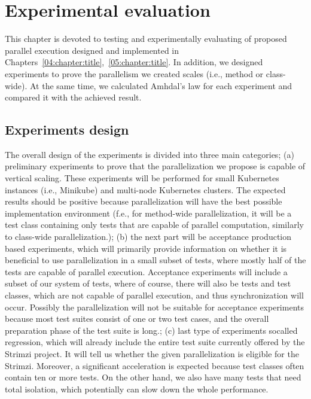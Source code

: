 \chapter{Experimental evaluation}
\label{06:chapter:title}

This chapter is devoted to testing and experimentally evaluating of proposed parallel execution designed and implemented in
Chapters~\ref{04:chapter:title},~\ref{05:chapter:title}.
In addition, we designed experiments to prove the parallelism we created scales (i.e., method or class-wide).
At the same time, we calculated Amhdal's law for each experiment and compared it with the achieved result.

\section{Experiments design}

The overall design of the experiments is divided into three main categories;
(a) preliminary experiments to prove that the parallelization we propose is capable of vertical scaling.
These experiments will be performed for small Kubernetes instances (i.e., Minikube) and multi-node Kubernetes clusters.
The expected results should be positive because parallelization will have the best possible implementation environment
(f.e., for method-wide parallelization, it will be a test class containing only tests that are capable of parallel computation,
similarly to class-wide parallelization.);
(b) the next part will be acceptance production based experiments, which will primarily provide information on whether it is beneficial
to use parallelization in a small subset of tests, where mostly half of the tests are capable of parallel execution.
Acceptance experiments will include a subset of our system of tests, where of course, there will also be tests and test classes,
which are not capable of parallel execution, and thus synchronization will occur.
Possibly the parallelization will not be suitable for acceptance experiments because most test suites consist of one or two test cases,
and the overall preparation phase of the test suite is long.;
(c) last type of experiments so\-called regression, which will already include the entire test suite currently offered by the Strimzi project.
It will tell us whether the given parallelization is eligible for the Strimzi.
Moreover, a significant acceleration is expected because test classes often contain ten or more tests.
On the other hand, we also have many tests that need total isolation, which potentially can slow down the whole performance.

